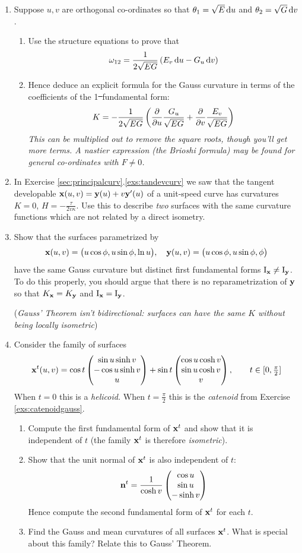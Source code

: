 \begin{exercises}{}{}
\begin{enumerate}
  
  \item\label{exs:gausscurvline} Suppose $u,v$ are orthogonal co-ordinates so that $\theta_1=\sqrt E\,{\mathrm{d} u}$ and $\theta_2=\sqrt G\,{\mathrm{d} v}$.
  \begin{enumerate}
    \item Use the structure equations to prove that
    \[\omega_{12}= \frac 1{2\sqrt{EG}}\left(E_v\,{\mathrm{d} u} -G_u\,{\mathrm{d} v}\right)\]
    \item Hence deduce an explicit formula for the Gauss curvature in terms of the coefficients of the 1\st\ fundamental form:
  	\[K=-\frac 1{2\sqrt{EG}}\left(\frac{\partial }{\partial u}\frac{G_u}{\sqrt{EG}}+\frac{\partial }{\partial v}\frac{E_v}{\sqrt{EG}}\right)\]
		\emph{This can be multiplied out to remove the square roots, though you'll get more terms. A nastier expression (the Brioshi formula) may be found for general co-ordinates with $F\neq 0$.}
		\end{enumerate}
  
  
  
  \item\label{exs:tandevkh} In Exercise \ref*{sec:principalcurv}.\ref{exs:tandevcurv} we saw that the tangent developable ${\mathbf{x}}(u,v)={\mathbf{y}}(u)+v{\mathbf{y}}'(u)$ of a unit-speed curve has curvatures $K=0$, $H=-\frac\tau{2v\kappa}$. Use this to describe \emph{two} surfaces with the same curvature functions which are not related by a direct isometry.
  
        
  \item Show that the surfaces parametrized by
  \[{\mathbf{x}}(u,v)=\bigl(u\cos\phi,u\sin\phi,\ln u\bigr),\quad {\mathbf{y}}(u,v)=\bigl(u\cos\phi,u\sin\phi,\phi\bigr)\]
  have the same Gauss curvature but distinct first fundamental forms $\mathrm{I}_{\mathbf{x}}\neq\mathrm{I}_{\mathbf{y}}$. To do this properly, you should argue that there is no reparametrization of ${\mathbf{y}}$ so that $K_{\mathbf{x}}=K_{\mathbf{y}}$ and $\mathrm{I}_{\mathbf{x}}=\mathrm{I}_{\mathbf{y}}$.\par
  (\emph{Gauss' Theorem isn't bidirectional: surfaces can have the same $K$ without being locally isometric})
  
  
  \item Consider the family of surfaces
  \[{\mathbf{x}}^t(u,v)=\cos t\begin{pmatrix}\sin u\sinh v\\-\cos u\sinh v\\u\end{pmatrix}+ \sin t\begin{pmatrix}\cos u\cosh v\\\sin u\cosh v\\v\end{pmatrix},\qquad t\in[0,\tfrac\pi 2]\]
   When $t=0$ this is a \emph{helicoid.} When $t=\frac\pi 2$ this is the \emph{catenoid} from Exercise \ref{exs:catenoidgauss}.
	\begin{enumerate}
  	\item Compute the first fundamental form of ${\mathbf{x}}^t$ and show that it is independent of $t$ (the family ${\mathbf{x}}^t$ is therefore \emph{isometric}). 
  	\item Show that the unit normal of ${\mathbf{x}}^t$ is also independent of $t$:
 	 	\[{\mathbf{n}}^t=\frac 1{\cosh v}\begin{pmatrix}\cos u\\\sin u\\-\sinh v\end{pmatrix}\]
  	Hence compute the second fundamental form of ${\mathbf{x}}^t$ for each $t$.
  	\item Find the Gauss and mean curvatures of all surfaces ${\mathbf{x}}^t$. What is special about this family? Relate this to Gauss' Theorem.
\end{enumerate}


\end{enumerate}
\end{exercises}
